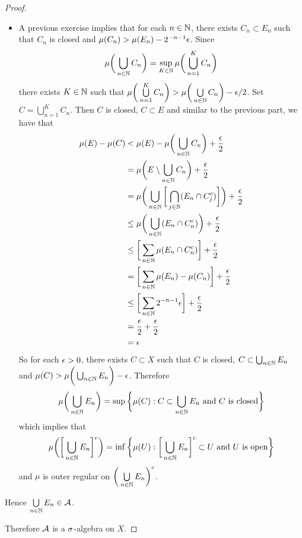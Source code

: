 \documentclass{book}
\begin{document}
\begin{proof}
\begin{enumerate}
\begin{itemize}
				\item A previous exercise implies that for each $n \in \mathbb{N}$, there exists $C_n \subset E_n$ such that $C_n$ is closed and $\mu(C_n) > \mu(E_n) - 2^{-n-1}\epsilon$. Since 
				$$\mu\bigg( \bigcup\limits_{n \in \mathbb{N}}C_n \bigg) = \sup\limits_{K \in \mathbb{N}} \mu\bigg(\bigcup\limits_{n=1}^K C_n \bigg)$$ 
				there exists $K \in \mathbb{N}$ such that $\mu\bigg(\bigcup\limits_{n=1}^K C_n \bigg) > \mu\bigg( \bigcup\limits_{n \in \mathbb{N}}C_n \bigg) - \epsilon/2 $. Set $C = \bigcup\limits_{n=1}^K C_n$.
				Then $C$ is closed, $C \subset E$ and similar to the previous part, we have that
				\begin{align*}
					\mu(E) - \mu(C)
					& < \mu(E) - \mu\bigg( \bigcup\limits_{n \in \mathbb{N}}C_n \bigg) + \frac{\epsilon}{2} \\
					&= \mu \bigg(E \setminus \bigcup\limits_{n \in \mathbb{N}}C_n   \bigg) +  \frac{\epsilon}{2} \\
					&= \mu \bigg( \bigcup\limits_{n \in \mathbb{N}} \bigg[ \bigcap_{j \in \mathbb{N}} (E_n \cap C_j^c)    \bigg] \bigg)  + \frac{\epsilon}{2} \\
					&\leq  \mu \bigg( \bigcup\limits_{n \in \mathbb{N}}  (E_n \cap C_n^c)  \bigg)  + \frac{\epsilon}{2} \\
					&\leq \bigg[ \sum\limits_{n \in \mathbb{N}} \mu(E_n \cap C_n^c) \bigg] + \frac{\epsilon}{2}\\
					&=\bigg[ \sum\limits_{n \in \mathbb{N}} \mu(E_n) - \mu(C_n) \bigg] +\frac{\epsilon}{2}\\
					&\leq \bigg[ \sum\limits_{n \in \mathbb{N}} 2^{-n-1}\epsilon \bigg] + \frac{\epsilon}{2}\\
					&= \frac{\epsilon}{2} + \frac{\epsilon}{2} \\
					&= \epsilon 
				\end{align*}
				So for each $\epsilon >0$, there exists $C \subset X$ such that $C$ is closed, $C \subset \bigcup_{n \in \mathbb{N}}E_n$ and $\mu(C) > \mu \bigg( \bigcup_{n \in \mathbb{N}} E_n \bigg) - \epsilon$. Therefore 
				$$\mu \bigg( \bigcup_{n \in \mathbb{N}} E_n \bigg) = \sup \bigg \{ \mu(C): C \subset \bigcup_{n \in \mathbb{N}} E_n  \text{ and $C$ is closed} \bigg \}$$
				which implies that 
				$$\mu \bigg( \bigg[ \bigcup_{n \in \mathbb{N}} E_n \bigg]^c \bigg) = \inf \bigg \{ \mu(U): \bigg[ \bigcup_{n \in \mathbb{N}} E_n \bigg]^c \subset U  \text{ and $U$ is open} \bigg \}$$
				and $\mu$ is outer regular on $\bigg( \bigcup\limits_{n \in \mathbb{N}} E_n \bigg)^c$.
			\end{itemize}
			Hence $\bigcup\limits_{n \in \mathbb{N}} E_n \in \mathcal{A}$.
		\end{enumerate}
		Therefore $\mathcal{A}$ is a $\sigma$-algebra on $X$.
	\end{proof}
	
\end{document}
